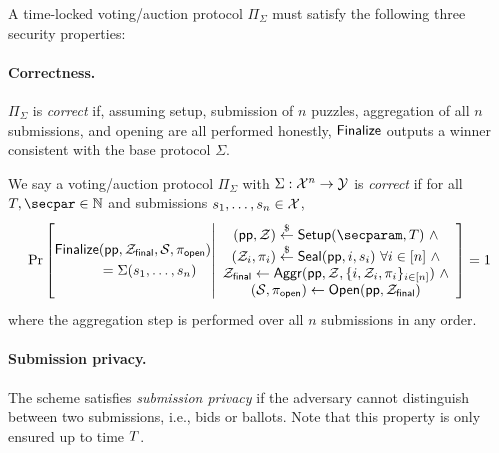 A time-locked voting/auction protocol $\Pi_\Sigma$ must satisfy the following three security properties:

\paragraph{Correctness.} 
$\Pi_\Sigma$ is \emph{correct} if, assuming setup, submission of $n$ puzzles, aggregation of all $n$ submissions, and opening are all performed honestly, $\sf Finalize$ outputs a winner consistent with the base protocol $\Sigma$.

\begin{definition}[Correctness]\label{def:correctness_cicada}
We say a voting/auction protocol $\Pi_\Sigma$ with $\Sigma: \mathcal{X}^n \to \mathcal{Y}$ is \emph{correct} if for all $\Ttime,\secpar \in \mathbb{N}$ and submissions $s_1, \dots, s_n \in \mathcal{X}$,
\[
    \Pr\left[
        \begin{aligned}
            &\\
            \Finalize &(\pp, \Z_{\sf final}, \mathcal{S}, \pi_{\sf open}) \\
            &= \Sigma(s_1, \dots, s_n)\\
            &\\
        \end{aligned}
        \middle|
        \begin{array}{c}
            (\pp, \Z) \sample \Setup(\secparam, \Ttime)~\land\\
            (\Z_i, \pi_i) \sample \Seal(\pp, i, s_i)~\forall i \in [n]~\land\\
            \Z_{\sf final} \gets \Aggr(\pp, \Z, \{i, \Z_i, \pi_i\}_{i \in [n]})~\land\\
            (\mathcal{S}, \pi_{\sf open}) \gets \Open(\pp, \Z_{\sf final}) \\
        \end{array}
    \right] = 1
\]
where the aggregation step is performed over all $n$ submissions in any order.
\end{definition}

\paragraph{Submission privacy.} 
The scheme satisfies \emph{submission privacy} if the adversary cannot distinguish between two submissions, i.e., bids or ballots. Note that this property is only ensured up to time $T$.

